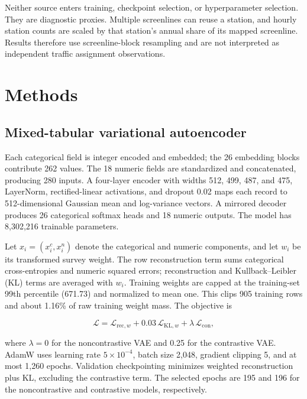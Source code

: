 \documentclass[numbered]{trbunofficial}
\begin{document}
Neither source enters training, checkpoint selection, or hyperparameter selection. They are diagnostic proxies. Multiple screenlines can reuse a station, and hourly station counts are scaled by that station's annual share of its mapped screenline. Results therefore use screenline-block resampling and are not interpreted as independent traffic assignment observations.

\section{Methods}

\subsection{Mixed-tabular variational autoencoder}

Each categorical field is integer encoded and embedded; the 26 embedding blocks contribute 262 values. The 18 numeric fields are standardized and concatenated, producing 280 inputs. A four-layer encoder with widths 512, 499, 487, and 475, LayerNorm, rectified-linear activations, and dropout 0.02 maps each record to 512-dimensional Gaussian mean and log-variance vectors. A mirrored decoder produces 26 categorical softmax heads and 18 numeric outputs. The model has 8,302,216 trainable parameters.

Let $x_i=(x_i^{c},x_i^{n})$ denote the categorical and numeric components, and let $w_i$ be its transformed survey weight. The row reconstruction term sums categorical cross-entropies and numeric squared errors; reconstruction and Kullback--Leibler (KL) terms are averaged with $w_i$. Training weights are capped at the training-set 99th percentile (671.73) and normalized to mean one. This clips 905 training rows and about 1.16\% of raw training weight mass. The objective is

\begin{linenomath*}
\begin{equation}
\mathcal{L}=\mathcal{L}_{\mathrm{rec},w}+0.03\,\mathcal{L}_{\mathrm{KL},w}+\lambda\,\mathcal{L}_{\mathrm{con}},
\label{eq:loss}
\end{equation}
\end{linenomath*}
where $\lambda=0$ for the noncontrastive VAE and 0.25 for the contrastive VAE. AdamW uses learning rate $5\times10^{-4}$, batch size 2,048, gradient clipping 5, and at most 1,260 epochs. Validation checkpointing minimizes weighted reconstruction plus KL, excluding the contrastive term. The selected epochs are 195 and 196 for the noncontrastive and contrastive models, respectively.
\end{document}
